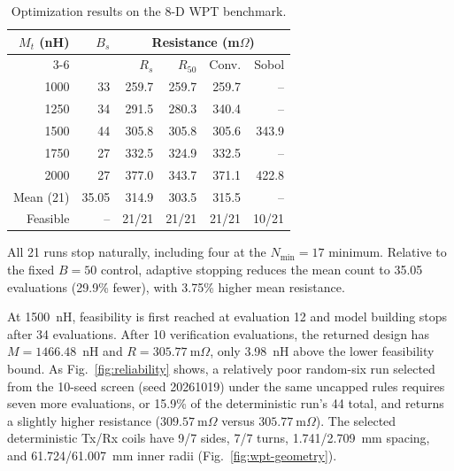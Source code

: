\documentclass[10pt,conference,letterpaper]{IEEEtran}
\begin{document}
\begin{table}[!t]
\caption{Optimization results on the 8-D WPT benchmark.}
\label{tab:wpt}
\centering
\footnotesize
\begin{tabular}{@{}rrrrrr@{}}
\toprule
$M_t$ (nH) & $B_s$ & \multicolumn{4}{c}{Resistance (m$\Omega$)} \\
\cmidrule(lr){3-6}
& & $R_s$ & $R_{50}$ & Conv. & Sobol \\
\midrule
1000 & 33 & 259.7 & 259.7 & 259.7 & -- \\
1250 & 34 & 291.5 & 280.3 & 340.4 & -- \\
1500 & 44 & 305.8 & 305.8 & 305.6 & 343.9 \\
1750 & 27 & 332.5 & 324.9 & 332.5 & -- \\
2000 & 27 & 377.0 & 343.7 & 371.1 & 422.8 \\
\midrule
Mean (21) & 35.05 & 314.9 & 303.5 & 315.5 & -- \\
Feasible & -- & 21/21 & 21/21 & 21/21 & 10/21 \\
\bottomrule
\end{tabular}
\end{table}

All 21 runs stop naturally, including four at the $N_{\min}=17$ minimum. Relative to the fixed $B=50$ control, adaptive stopping reduces the mean count to 35.05 evaluations (29.9\% fewer), with 3.75\% higher mean resistance.

At 1500~nH, feasibility is first reached at evaluation 12 and model building stops after 34 evaluations. After 10 verification evaluations, the returned design has $M=1466.48$~nH and $R=305.77~\mathrm{m}\Omega$, only 3.98~nH above the lower feasibility bound. As Fig.~\ref{fig:reliability} shows, a relatively poor random-six run selected from the 10-seed screen (seed 20261019) under the same uncapped rules requires seven more evaluations, or 15.9\% of the deterministic run's 44 total, and returns a slightly higher resistance ($309.57~\mathrm{m}\Omega$ versus $305.77~\mathrm{m}\Omega$). The selected deterministic Tx/Rx coils have 9/7 sides, 7/7 turns, 1.741/2.709~mm spacing, and 61.724/61.007~mm inner radii (Fig.~\ref{fig:wpt-geometry}).
\end{document}
